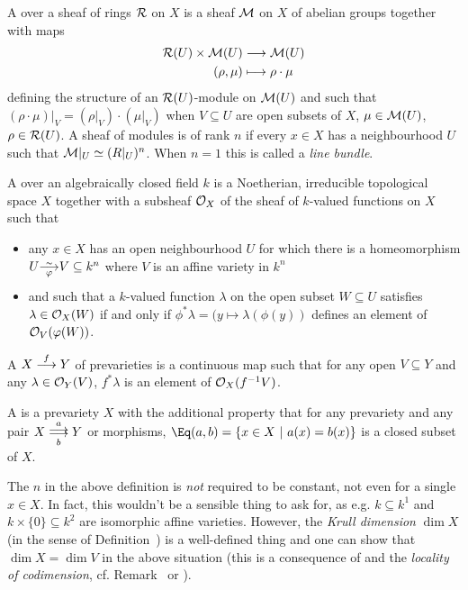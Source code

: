 \documentclass[a4paper,parskip=half,numbers=enddot, DIV=12]{scrreprt}
\begin{document}
\begin{defi}
    A  over a sheaf of rings $\mathcal{R}$ on $X$ is a sheaf $\mathcal{M}$ on $X$ of abelian groups together with maps 
    \begin{align*}
        \Rr(U) \times \Mm(U) &\morphism \Mm(U)\\
        (\rho,\mu) &\longmapsto \rho\cdot\mu
    \end{align*}
    defining the structure of an $\mathcal{R}(U)$-module on $\mathcal{M}(U)$ and such that $(\rho\cdot \mu)|_V = (\rho|_V)\cdot (\mu|_V)$ when $V\subseteq U$ are open subsets of $X$, $\mu\in \mathcal{M}(U)$, $\rho \in \mathcal{R}(U)$. A sheaf of modules is  of rank $n$ if every $x\in X$ has a neighbourhood $U$ such that $\mathcal{M}|_U\simeq(R|_U)^n$. When $n=1$ this is called a \emph{line bundle}.
\end{defi}
\begin{defi}[Prevariety]
    A  over an algebraically closed field $k$ is a Noetherian, irreducible topological space $X$ together with a subsheaf $\mathcal{O}_X$ of the sheaf of $k$-valued functions on $X$ such that 
    \begin{itemize}
    	\item any $x\in X$ has an open neighbourhood $U$ for which there is a homeomorphism $U\smash{\isomorphism[\phi]} V\subseteq k^n$ where $V$ is an affine variety in $k^n$
    	\item and such that a $k$-valued function $\lambda$ on the open subset $W\subseteq U$ satisfies $\lambda \in \mathcal{O}_X(W)$ if and only if $\phi^*\lambda = (y\mapsto \lambda(\phi(y))$ defines an element of $\mathcal{O}_V(\varphi(W))$. 
    \end{itemize}
    
    A  $X\morphism[f] Y$ of prevarieties is a continuous map such that for any open $V\subseteq Y$ and any $\lambda \in\mathcal{O}_Y(V)$, $f^*\lambda$ is an element of $\mathcal{O}_X(f^{-1}V)$.
    
    A  is a prevariety $X$ with the additional property that for any prevariety and any pair $X\doublemorphism[a][b] Y$ or morphisms, $\Eq(a,b) = \left\{x\in X\st a(x) = b(x)\right\}$ is a closed subset of $X$.
\end{defi}
\begin{rem}
The $n$ in the above definition is \emph{not} required to be constant, not even for a single $x\in X$. In fact, this wouldn't be a sensible thing to ask for, as e.g. $k\subseteq k^1$ and $k\times\{0\}\subseteq k^2$ are isomorphic affine varieties. However, the \emph{Krull dimension} $\dim X$ (in the sense of Definition~) is a well-defined thing and one can show that $\dim X=\dim V$ in the above situation (this is a consequence of \cite[Theorem~6]{alg1} and the \emph{locality of codimension}, cf. Remark~ or \cite[Remark~2.1.3]{alg1}).
\end{rem}
\end{document}
